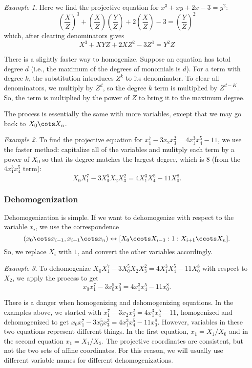\documentclass[12pt]{amsart}
\theoremstyle{plain}
\theoremstyle{definition}
\theoremstyle{remark}
\newtheorem*{exam}{Example}
\begin{document}
\begin{exam}
  Here we find the projective equation for $x^3+xy+2x -3=y^2$:
  \[ \left(\frac X Z\right)^3 + \left(\frac X Z\right) \left(\frac Y
    Z\right) +2 \left(\frac X Z\right) - 3 = \left(\frac Y Z\right)^2
\]
 which, after clearing denominators gives
\[X^3+XYZ + 2XZ^2 -3Z^3 = Y^2Z\]
\end{exam}

There is a slightly faster way to homogenize.  Suppose an equation has
total degree $d$ (i.e., the maximum of the degrees of monomials is
$d$).  For a term with degree $k$, the substitution introduces $Z^k$
to its denominator.  To clear all denominators, we multiply by $Z^d$,
so the degree $k$ term is multiplied by $Z^{d-K}$.  So, the term is
multiplied by the power of $Z$ to bring it to the maximum degree.

The process is essentially the same with more variables, except that
we may go back to $X_0\cots X_n$.
\begin{exam}
  To find the projective equation for
  $x_1^7-3x_2x_3^2=4x_1^3x_4^5-11$, we use the faster method:
  capitalize all of the variables and mulitply each term by a power of
  $X_0$ so that its degree matches the largest degree, which is $8$
  (from the $4x_1^3x_4^5$ term):
  \[ X_0X_1^7-3X_0^5X_2X_3^2=4X_1^3X_4^5-11X_0^8.\]
\end{exam}
\subsubsection{Dehomogenization}
Dehomogenization is simple.  If we want to dehomogenize with respect
to the variable $x_i$, we use the correspondence
\[ (x_0\cots x_{i-1}, x_{i+1}\cots x_n) \leftrightarrow [X_0\ccots
X_{i-1}:1:X_{i+1}\ccots X_n].\]
So, we replace $X_i$ with $1$, and convert the other variables
accordingly.
\begin{exam}
  To dehomogenize $ X_0X_1^7-3X_0^5X_2X_3^2=4X_1^3X_4^5-11X_0^8$ with
  respect to $X_2$, we apply the process to get
  \[ x_0x_1^7-3x_0^5x_3^2=4x_1^3x_4^5-11x_0^8.\]
\end{exam}

There is a danger when homogenizing and dehomogenizing equations.  In
the examples above, we started with $x_1^7-3x_2x_3^2=4x_1^3x_4^5-11$,
homogenized and dehomogenized to get
$x_0x_1^7-3x_0^5x_3^2=4x_1^3x_4^5-11x_0^8$.  However, variables in
these two equations represent different things.  In the first
equation, $x_1=X_1/X_0$ and in the second equation $x_1=X_1/X_2$.  The
projective coordinates are consistent, but not the two sets of affine
coordinates.  For this reason, we will usually use different variable
names for different dehomogenizations.
\end{document}

